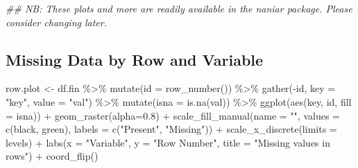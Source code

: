 \documentclass[
  letterpaper,
  DIV=11,
  numbers=noendperiod]{scrartcl}
\newenvironment{Shaded}{\begin{snugshade}}{\end{snugshade}}
\newcommand{\AttributeTok}[1]{\textcolor[rgb]{0.40,0.45,0.13}{#1}}
\newcommand{\DocumentationTok}[1]{\textcolor[rgb]{0.37,0.37,0.37}{\textit{#1}}}
\newcommand{\FloatTok}[1]{\textcolor[rgb]{0.68,0.00,0.00}{#1}}
\newcommand{\FunctionTok}[1]{\textcolor[rgb]{0.28,0.35,0.67}{#1}}
\newcommand{\NormalTok}[1]{\textcolor[rgb]{0.00,0.23,0.31}{#1}}
\newcommand{\OtherTok}[1]{\textcolor[rgb]{0.00,0.23,0.31}{#1}}
\newcommand{\SpecialCharTok}[1]{\textcolor[rgb]{0.37,0.37,0.37}{#1}}
\newcommand{\StringTok}[1]{\textcolor[rgb]{0.13,0.47,0.30}{#1}}
\begin{document}
\begin{Shaded}
\begin{Highlighting}[]
\DocumentationTok{\#\# NB: These plots and more are readily available in the \textasciigrave{}naniar\textasciigrave{} package.  Please consider changing later.}
\end{Highlighting}
\end{Shaded}

\subsection{Missing Data by Row and
Variable}\label{missing-data-by-row-and-variable}

\begin{Shaded}
\begin{Highlighting}[]
\NormalTok{row.plot }\OtherTok{\textless{}{-}}\NormalTok{ df.fin }\SpecialCharTok{\%\textgreater{}\%}
  \FunctionTok{mutate}\NormalTok{(}\AttributeTok{id =} \FunctionTok{row\_number}\NormalTok{()) }\SpecialCharTok{\%\textgreater{}\%}
  \FunctionTok{gather}\NormalTok{(}\SpecialCharTok{{-}}\NormalTok{id, }\AttributeTok{key =} \StringTok{"key"}\NormalTok{, }\AttributeTok{value =} \StringTok{"val"}\NormalTok{) }\SpecialCharTok{\%\textgreater{}\%}
  \FunctionTok{mutate}\NormalTok{(}\AttributeTok{isna =} \FunctionTok{is.na}\NormalTok{(val)) }\SpecialCharTok{\%\textgreater{}\%}
  \FunctionTok{ggplot}\NormalTok{(}\FunctionTok{aes}\NormalTok{(key, id, }\AttributeTok{fill =}\NormalTok{ isna)) }\SpecialCharTok{+}
    \FunctionTok{geom\_raster}\NormalTok{(}\AttributeTok{alpha=}\FloatTok{0.8}\NormalTok{) }\SpecialCharTok{+}
    \FunctionTok{scale\_fill\_manual}\NormalTok{(}\AttributeTok{name =} \StringTok{""}\NormalTok{,}
        \AttributeTok{values =} \FunctionTok{c}\NormalTok{(}\StringTok{\textquotesingle{}black\textquotesingle{}}\NormalTok{, }\StringTok{\textquotesingle{}green\textquotesingle{}}\NormalTok{),}
        \AttributeTok{labels =} \FunctionTok{c}\NormalTok{(}\StringTok{"Present"}\NormalTok{, }\StringTok{"Missing"}\NormalTok{)) }\SpecialCharTok{+}
    \FunctionTok{scale\_x\_discrete}\NormalTok{(}\AttributeTok{limits =}\NormalTok{ levels) }\SpecialCharTok{+}
    \FunctionTok{labs}\NormalTok{(}\AttributeTok{x =} \StringTok{"Variable"}\NormalTok{,}
         \AttributeTok{y =} \StringTok{"Row Number"}\NormalTok{, }
         \AttributeTok{title =} \StringTok{"Missing values in rows"}\NormalTok{) }\SpecialCharTok{+}
    \FunctionTok{coord\_flip}\NormalTok{()}
\end{Highlighting}
\end{Shaded}
\end{document}
